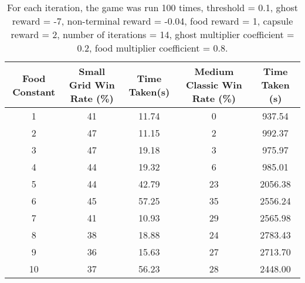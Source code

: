 \documentclass[12pt]{report}
\begin{document}
              \vspace{-9mm}
              \begin{table}[H]
                \begin{center}
                  \begin{adjustbox}{max width=\textwidth}
                    \begin{tabular}{*{5}{c}}
                      \textbf{Food Constant} & \textbf{Small Grid Win Rate (\%)} & \textbf{Time Taken(s)} & \textbf{Medium Classic Win Rate (\%)} & \textbf{Time Taken (s)}\\
                    \hline
                          1 & 41 & 11.74 & 0 & 937.54 \\
                          2 & 47 & 11.15 & 2 & 992.37 \\
                          3 & 47 & 19.18 & 3 & 975.97 \\
                          4 & 44 & 19.32 & 6 & 985.01 \\
                          5 & 44 & 42.79 & 23 & 2056.38 \\
                          6 & 45 & 57.25 & 35 & 2556.24 \\
                          7 & 41 & 10.93 & 29 & 2565.98 \\
                          8 & 38 & 18.88 & 24 & 2783.43 \\
                          9 & 36 & 15.63 & 27 & 2713.70 \\
                          10 & 37 & 56.23 & 28 & 2448.00 \\

                  \end{tabular}
                  \end{adjustbox}
                  \caption{For each iteration, the game was run 100 times, threshold = 0.1, ghost reward = -7, non-terminal reward = -0.04, food reward = 1, capsule reward = 2, number of iterations = 14, ghost multiplier coefficient = 0.2, food multiplier coefficient = 0.8.}
                  \label{tab:table4}
                \end{center}
              \end{table}
\end{document}
